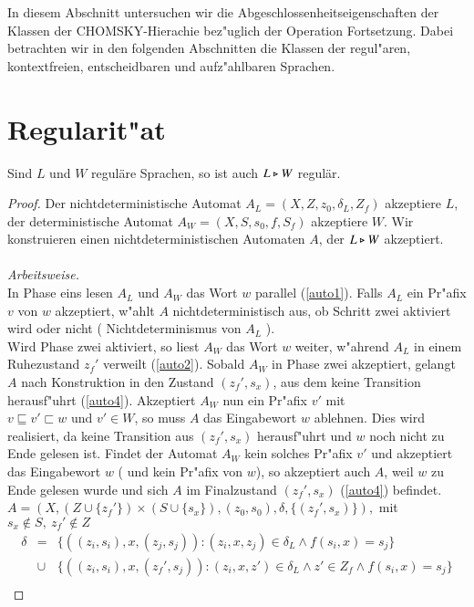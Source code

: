 In diesem Abschnitt untersuchen wir die Abgeschlossenheitseigenschaften der Klassen der CHOMSKY-Hierachie bez"uglich der Operation Fortsetzung. 
Dabei betrachten wir in den folgenden Abschnitten die Klassen der regul"aren, kontextfreien, entscheidbaren und aufz"ahlbaren Sprachen.

\section{Regularit"at}\label{abschnittreg}
\begin{satz}
Sind $L$ und $W$ regul\"are Sprachen, so ist auch $L\triangleright W$ regul\"ar.
\end{satz}
\begin{proof}
Der nichtdeterministische Automat $A_L= (X,Z,z_{0},\delta_L,Z_f)$ akzeptiere $L$, der deterministische Automat $A_W = (X,S,s_{0},f,S_{f})$ akzeptiere $W$.
Wir konstruieren einen nichtdeterministischen Automaten $A$, der $L\triangleright W$ akzeptiert.\\\\\emph{Arbeitsweise.}\\
In Phase eins lesen $A_L$ und $A_W$ das Wort $w$ parallel (\ref{auto1}). Falls $A_L$ ein Pr"afix $v$ von $w$ akzeptiert, w"ahlt $A$ nichtdeterministisch aus, ob Schritt zwei aktiviert wird oder nicht ( Nichtdeterminismus von $A_L$ ).\\
Wird Phase zwei aktiviert, so liest $A_W$ das Wort $w$ weiter, w"ahrend $A_L$ in einem Ruhezustand $z_f'$ verweilt (\ref{auto2}). Sobald $A_W$ in Phase zwei akzeptiert, gelangt $A$ nach Konstruktion in den Zustand $(z_f',s_x)$, aus dem keine Transition herausf"uhrt (\ref{auto4}). Akzeptiert $A_W$ nun ein Pr"afix $v'$ mit $v\sqsubseteq v'\sqsubset w\text{ und } v'\in W$, so muss $A$ das Eingabewort $w$ ablehnen. Dies wird realisiert, da keine Transition aus $(z_f',s_x)$ herausf"uhrt und $w$ noch nicht zu Ende gelesen ist. Findet der Automat $A_W$ kein solches Pr"afix $v'$ und akzeptiert das Eingabewort $w$ ( und kein Pr"afix von $w$), so akzeptiert auch $A$, weil $w$ zu Ende gelesen wurde und sich $A$ im Finalzustand $(z_f',s_x)$ (\ref{auto4}) befindet.
\\$A = (X,(Z\cup \{ z_f'\})\times (S\cup \{ s_x\}), (z_{0},s_{0}), \delta , \{ (z_f',s_x) \} ),$ mit $s_x\notin S,\ z_f'\notin Z$
\setcounter{equation}{0}
\begin{eqnarray}
 \delta &=&\{ ((z_i,s_i),x,(z_j,s_j)) : (z_i,x,z_j) \in \delta_L \wedge f(s_i,x)=s_j  \}  \label{auto1} \\
 & \cup & \{ ((z_i,s_i),x,(z_f',s_j)) : (z_i,x,z') \in \delta_L \wedge z'\in Z_f \wedge f(s_i,x)=s_j  \} \label{auto2}\\

\end{eqnarray}
\end{proof}
